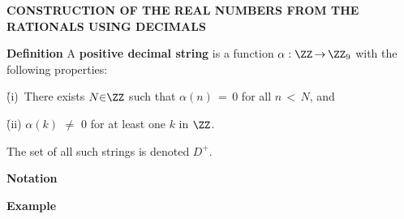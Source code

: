 \newpage

        {\bf CONSTRUCTION OF THE REAL NUMBERS FROM THE RATIONALS USING DECIMALS}%

\VV

        {\bf Definition} A {\bf positive decimal string} is a function ${\alpha}:{\ZZ} \,{\rightarrow}\, {\ZZ}_{9}$ with the following properties:

        \h (i)\, There exists $N{\in}{\ZZ}$ such that ${\alpha}(n) \,=\, 0$ for all $n\,<\,N$, and

        \h (ii) ${\alpha}(k) \,\,{\neq}\,\, 0$ for at least one $k$ in ${\ZZ}$.

\noindent The set of all such strings is denoted $D^{+}$.

\VV

        {\bf Notation} 

\VV

        {\bf Example} 


\VV



\newpage



